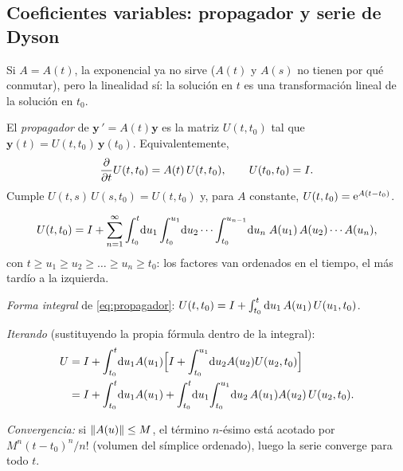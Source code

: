 \documentclass[11pt,twoside]{article}
\newcommand\vy{\bm{y}}
\begin{document}
\subsection{Coeficientes variables: propagador y serie de Dyson}

Si $A=A(t)$, la exponencial ya no sirve ($A(t)$ y $A(s)$ no tienen por qué conmutar), pero la linealidad sí: la
solución en $t$ es una transformación lineal de la solución en $t_0$.

\begin{definicion}[Propagador]\label{def:propagador}
El \emph{propagador} de $\vy\,'=A(t)\vy$ es la matriz $U(t,t_0)$ tal que $\vy(t)=U(t,t_0)\,\vy(t_0)$. Equivalentemente,
\begin{equation}\label{eq:propagador}
\frac{\partial}{\partial t}U(t,t_0)=A(t)\,U(t,t_0),\qquad U(t_0,t_0)=I .
\end{equation}
Cumple $U(t,s)\,U(s,t_0)=U(t,t_0)$ y, para $A$ constante, $U(t,t_0)=\mathrm{e}^{A(t-t_0)}$.
\end{definicion}

\begin{teorema}\label{teo:dyson}
\begin{equation}\label{eq:dyson}
U(t,t_0)=I+\sum_{n=1}^{\infty}\int_{t_0}^{t}\!\mathop{}\!\mathrm{d} u_1\int_{t_0}^{u_1}\!\mathop{}\!\mathrm{d} u_2\cdots\int_{t_0}^{u_{n-1}}\!\mathop{}\!\mathrm{d} u_n\;
A(u_1)\,A(u_2)\cdots A(u_n),
\end{equation}
con $t\ge u_1\ge u_2\ge\dots\ge u_n\ge t_0$: los factores van ordenados en el tiempo, el más tardío a la izquierda.
\end{teorema}

\begin{demostracion}
\begin{pasos}
\item \emph{Forma integral} de \eqref{eq:propagador}: $U(t,t_0)=I+\int_{t_0}^{t}\mathop{}\!\mathrm{d} u_1\,A(u_1)\,U(u_1,t_0)$.
\item \emph{Iterando} (sustituyendo la propia fórmula dentro de la integral):
\begin{equation*}
\begin{aligned}
U&=\Id+\int_{t_0}^{t}\!\dd u_1A(u_1)\Big[\Id+\int_{t_0}^{u_1}\!\dd u_2A(u_2)U(u_2,t_0)\Big]\\
&=\Id+\int_{t_0}^{t}\!\dd u_1A(u_1)+\int_{t_0}^{t}\!\dd u_1\!\int_{t_0}^{u_1}\!\dd u_2\,A(u_1)A(u_2)\,U(u_2,t_0).
\end{aligned}
\end{equation*}
\item \emph{Convergencia:} si $\lVert A(u)\rVert\le M$, el término $n$-ésimo está acotado por $M^n(t-t_0)^n/n!$ (volumen del
símplice ordenado), luego la serie converge para todo $t$.
\end{pasos}
\end{demostracion}
\end{document}
